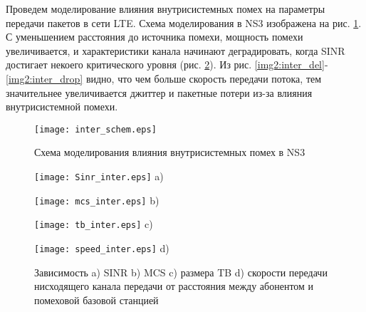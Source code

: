 Проведем моделирование влияния внутрисистемных помех на параметры передачи пакетов в сети LTE. Схема моделирования в NS3 изображена на рис. \ref{img:inter_schem}. С уменьшением расстояния до источника помехи, мощность помехи увеличивается, и характеристики канала начинают деградировать, когда SINR достигает некоего критического уровня (рис. \ref{img:inter}).
Из рис. \ref{img2:inter_del}-\ref{img2:inter_drop} видно, что чем больше скорость передачи потока, тем значительнее увеличивается джиттер и пакетные потери из-за влияния внутрисистемной помехи.
\begin{figure} [!h]
  \center
\texttt{[image: inter\_schem.eps]}
  \caption{Схема моделирования влияния внутрисистемных помех в NS3}
  \label{img:inter_schem}
\end{figure}
\begin{figure} [!h]
\begin{minipage}[h]{0.47\linewidth}
\center
\texttt{[image: Sinr\_inter.eps]} a) \\
\end{minipage}
\hfill
\begin{minipage}[h]{0.47\linewidth}
\center
\texttt{[image: mcs\_inter.eps]} b) \\
\end{minipage}
\vfill
\begin{minipage}[h]{0.47\linewidth}
\center
\texttt{[image: tb\_inter.eps]} c) \\
\end{minipage}
\hfill
\begin{minipage}[h]{0.47\linewidth}
\center
\texttt{[image: speed\_inter.eps]} d) \\
\end{minipage}
\caption{Зависимость a) SINR b) MCS c) размера TB d) скорости передачи нисходящего канала передачи от расстояния между абонентом и помеховой базовой станцией}
\label{img:inter}
\end{figure}


